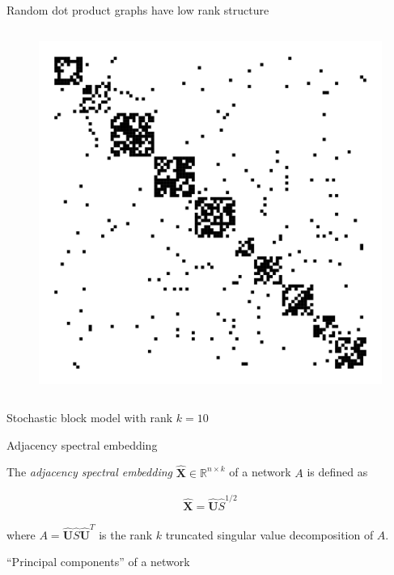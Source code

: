 \documentclass{beamer}
\theoremstyle{remark}
\newcommand{\X}{\bm X}
\newcommand{\Xhat}{\widehat{\X}}
\newcommand \R {\mathbb{R}}
\renewcommand{\S}{\widehat S}
\newcommand{\U}{\widehat{\bm U}}
\begin{document}
\begin{frame}{Random dot product graphs have low rank structure}
\begin{columns}
        \begin{figure}
            \includegraphics[width=\textwidth]{figures/presentation/adjacency-sample.png}
        \end{figure}

    \end{columns}

    \centering
    Stochastic block model with rank $k = 10$

\end{frame}

\begin{frame}{Adjacency spectral embedding}

    \begin{definition}[ASE]

        The \emph{adjacency spectral embedding} $\Xhat \in \R^{n \times k}$ of a network $A$ is defined as

        \begin{align*}
            \Xhat = \U \S^{1/2}
        \end{align*}

        \noindent where $A = \U \S \U^T$ is the rank $k$ truncated singular value decomposition of $A$.
    \end{definition}

    ``Principal components'' of a network

\end{frame}
\end{document}
